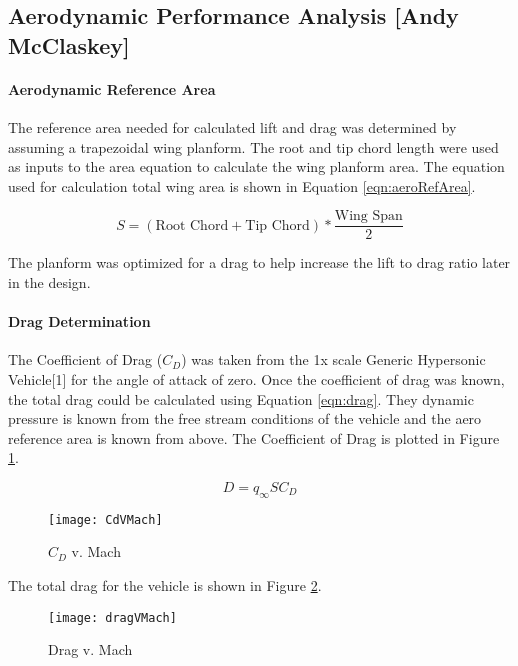 \subsection{Aerodynamic Performance Analysis [Andy McClaskey]}
\paragraph{Aerodynamic Reference Area}
The reference area needed for calculated lift and drag was determined by assuming a trapezoidal wing planform. The root and tip chord length were used as inputs to the area equation to calculate the wing planform area. The equation used for calculation total wing area is shown in Equation \ref{eqn:aeroRefArea}.

\begin{equation}
\label{eqn:aeroRefArea}
S = (\text{Root Chord} + \text{Tip Chord})*\frac{\text{Wing Span}}{2}
\end{equation}

The planform was optimized for a drag to help increase the lift to drag ratio later in the design.

\paragraph{Drag Determination}

The Coefficient of Drag ($C_D$) was taken from the 1x scale Generic Hypersonic Vehicle[1] for the angle of attack of zero. Once the coefficient of drag was known, the total drag could be calculated using Equation \ref{eqn:drag}. They dynamic pressure is known from the free stream conditions of the vehicle and the aero reference area is known from above. The Coefficient of Drag is plotted in Figure \ref{fig:CdVMach}.

\begin{equation}
\label{eqn:drag}
D = q_{\infty}SC_D
\end{equation}

\begin{figure}[H]
\begin{center}
\texttt{[image: CdVMach]}
\caption{$C_D$ v. Mach}
\label{fig:CdVMach}
\end{center}
\end{figure}

The total drag for the vehicle is shown in Figure \ref{fig:dragVMach}.

\begin{figure}[H]
\begin{center}
\texttt{[image: dragVMach]}
\caption{Drag v. Mach}
\label{fig:dragVMach}
\end{center}
\end{figure}

